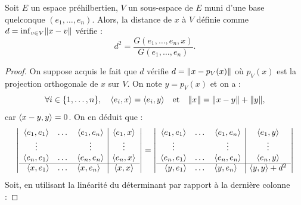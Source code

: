 \begin{thm}
Soit $E$ un espace préhilbertien, $V$ un sous-espace de $E$ muni d'une base quelconque $(e_1, \dots, e_n)$. 
Alors, la distance de $x$ à $V$ définie comme $d = \inf_{v \in V} \lVert x-v\rVert$ vérifie :
\[ d^2 = \dfrac{G(e_1, \dots, e_n, x)}{G(e_1, \dots, e_n)} . \]
\end{thm}

\begin{proof}
On suppose acquis le fait que $d$ vérifie $d = \lVert x - p_V(x)\rVert$ où $p_V(x)$ est la projection orthogonale de $x$ sur $V$. 
On note $y = p_V(x)$ et on a :
\[ \forall i \in \{ 1, \dots, n \}, \quad \langle e_i, x \rangle = \langle e_i, y\rangle \quad \text{et} \quad \lVert x\rVert = \lVert x-y\rVert + \lVert y\rVert , \]
car $\langle x-y, y\rangle = 0$. On en déduit que :
\[ \left | \begin{array}{c | c}
\begin{matrix}
\langle e_1, e_1\rangle & \dots & \langle e_1, e_n\rangle \\
\vdots & & \vdots \\
\langle e_n, e_1\rangle & \dots & \langle e_n, e_n\rangle
\end{matrix} & \begin{matrix} \langle e_1, x\rangle \\ \vdots \\ \langle e_n, x\rangle \end{matrix} \\
\hline 
\begin{matrix} \langle x, e_1\rangle & \dots & \langle x, e_n\rangle \end{matrix} & \langle x, x\rangle
\end{array} \right | 
= \left | \begin{array}{c | c}
\begin{matrix}
\langle e_1, e_1\rangle & \dots & \langle e_1, e_n\rangle \\
\vdots & & \vdots \\
\langle e_n, e_1\rangle & \dots & \langle e_n, e_n\rangle
\end{matrix} & \begin{matrix} \langle e_1, y\rangle \\ \vdots \\ \langle e_n, y\rangle \end{matrix} \\
\hline 
\begin{matrix} \langle y, e_1\rangle & \dots & \langle y, e_n\rangle \end{matrix} & \langle y,y\rangle + d^2
\end{array} \right | \]
Soit, en utilisant la linéarité du déterminant par rapport à la dernière colonne :

\end{proof}
